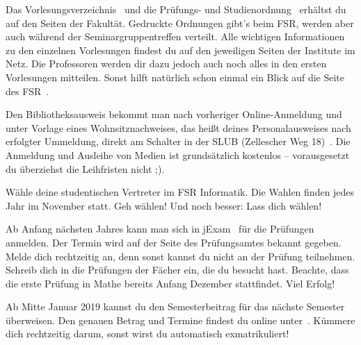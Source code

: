 \begin{itemize}[leftmargin=*]
Das Vorlesungsverzeichnis~ und die Prüfungs- und
Studienordnung~ erhältst du
auf den Seiten der Fakultät. Gedruckte Ordnungen gibt's beim FSR, werden aber auch während der Seminargruppentreffen verteilt.
Alle wichtigen Informationen zu den einzelnen Vorlesungen findest du
auf den jeweiligen Seiten der Institute im Netz.  Die Professoren werden dir
dazu jedoch auch noch alles in den ersten Vorlesungen mitteilen. Sonst hilft
natürlich schon einmal ein Blick auf die Seite des FSR~.

Den Bibliotheksausweis bekommt man nach vorheriger Online-Anmeldung und unter Vorlage eines
Wohnsitznachweises, das heißt deines Personalausweises nach erfolgter Ummeldung,
direkt am Schalter in der SLUB (Zellescher Weg 18)~. Die Anmeldung und Ausleihe
von Medien ist grundsätzlich kostenlos -- vorausgesetzt du überziehst die
Leihfristen nicht ;).

Wähle deine studentischen Vertreter im FSR Informatik. Die Wahlen finden jedes
Jahr im November statt. Geh wählen! Und noch besser: Lass dich wählen!

\pagebreak

Ab Anfang nächsten Jahres kann man sich in jExam~ für die Prüfungen anmelden.
Der Termin wird auf der Seite des Prüfungsamtes bekannt gegeben. Melde dich
rechtzeitig an, denn sonst kannst du nicht an der Prüfung teilnehmen. Schreib
dich in die Prüfungen der Fächer ein, die du besucht hast. Beachte, dass die
erste Prüfung in Mathe bereits Anfang Dezember stattfindet. Viel Erfolg!

Ab Mitte Januar 2019 kannst du den Semesterbeitrag für das nächste Semester
überweisen. Den genauen Betrag und Termine findest du online unter~. Kümmere dich rechtzeitig darum,
sonst wirst du automatisch exmatrikuliert!

\end{itemize}

\vfill

